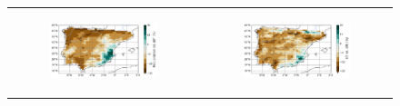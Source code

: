 \begin{figure}[htbp]
    \centering
    \begin{tabular}{cc}
        \begin{subfigure}[b]{0.5\textwidth}
            \caption{}
            \includegraphics[width=\textwidth]{images/chap4/future/reldiffmap_precip_presfut.png}
        \end{subfigure} &
        \begin{subfigure}[b]{0.5\textwidth}
            \caption{}
            \includegraphics[width=\textwidth]{images/chap4/future/reldiffmap_evap_presfut.png}
        \end{subfigure} \\


\end{tabular}
\end{figure}
